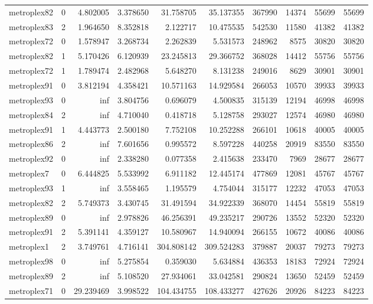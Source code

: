 \begin{longtable}{|l|r|r|r|r|r|r|r|r|r|}
metroplex82 & 0 & 4.802005 & 3.378650 & 31.758705 & 35.137355 & 367990 & 14374 & 55699 & 55699 \\
metroplex83 & 2 & 1.964650 & 8.352818 & 2.122717 & 10.475535 & 542530 & 11580 & 41382 & 41382 \\
metroplex72 & 0 & 1.578947 & 3.268734 & 2.262839 & 5.531573 & 248962 & 8575 & 30820 & 30820 \\
metroplex82 & 1 & 5.170426 & 6.120939 & 23.245813 & 29.366752 & 368028 & 14412 & 55756 & 55756 \\
metroplex72 & 1 & 1.789474 & 2.482968 & 5.648270 & 8.131238 & 249016 & 8629 & 30901 & 30901 \\
metroplex91 & 0 & 3.812194 & 4.358421 & 10.571163 & 14.929584 & 266053 & 10570 & 39933 & 39933 \\
metroplex93 & 0 & inf & 3.804756 & 0.696079 & 4.500835 & 315139 & 12194 & 46998 & 46998 \\
metroplex84 & 2 & inf & 4.710040 & 0.418718 & 5.128758 & 293027 & 12574 & 46980 & 46980 \\
metroplex91 & 1 & 4.443773 & 2.500180 & 7.752108 & 10.252288 & 266101 & 10618 & 40005 & 40005 \\
metroplex86 & 2 & inf & 7.601656 & 0.995572 & 8.597228 & 440258 & 20919 & 83550 & 83550 \\
metroplex92 & 0 & inf & 2.338280 & 0.077358 & 2.415638 & 233470 & 7969 & 28677 & 28677 \\
metroplex7 & 0 & 6.444825 & 5.533992 & 6.911182 & 12.445174 & 477869 & 12081 & 45767 & 45767 \\
metroplex93 & 1 & inf & 3.558465 & 1.195579 & 4.754044 & 315177 & 12232 & 47053 & 47053 \\
metroplex82 & 2 & 5.749373 & 3.430745 & 31.491594 & 34.922339 & 368070 & 14454 & 55819 & 55819 \\
metroplex89 & 0 & inf & 2.978826 & 46.256391 & 49.235217 & 290726 & 13552 & 52320 & 52320 \\
metroplex91 & 2 & 5.391141 & 4.359127 & 10.580967 & 14.940094 & 266155 & 10672 & 40086 & 40086 \\
metroplex1 & 2 & 3.749761 & 4.716141 & 304.808142 & 309.524283 & 379887 & 20037 & 79273 & 79273 \\
metroplex98 & 0 & inf & 5.275854 & 0.359030 & 5.634884 & 436353 & 18183 & 72924 & 72924 \\
metroplex89 & 2 & inf & 5.108520 & 27.934061 & 33.042581 & 290824 & 13650 & 52459 & 52459 \\
metroplex71 & 0 & 29.239469 & 3.998522 & 104.434755 & 108.433277 & 427626 & 20926 & 84223 & 84223 \\

\end{longtable}
